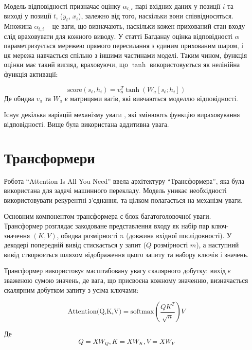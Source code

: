Модель відповідності призначає оцінку $\alpha_{t,i}$
парі вхідних даних у позиції $i$ та виході у позиції $t$, ($y_t$, $x_i$),
залежно від того, наскільки вони співвідносяться. Множина
${α_{t,i}}$ -- це ваги, що визначають, наскільки кожен прихований стан
входу слід враховувати для кожного виводу.
У статті Багданау \cite{nn:attention} оцінка відповідності
$α$ параметризується мережею прямого пересилання
з єдиним прихованим шаром, і ця мережа навчається спільно з
іншими частинами моделі. Таким чином, функція оцінки
має такий вигляд, враховуючи, що $\tanh$ використовується як
нелінійна функція активації:

\begin{equation}
    \text{score}(s_t, h_i) = v^T_a \tanh(W_a [s_t;h_i])
\end{equation}
Де обидва $v_a$ та $W_a$ є матрицями вагів, які вивчаються
моделлю відповідності.

Існує декілька варіацій механізму
уваги \cite{attention:1} \cite{attention:2}, які змінюють
функцію вираховування відповідності. Вище
була використана аддитивна \cite{nn:attention} увага.

\section{Трансформери}
Робота ``Attention Is All You Need'' \cite{attention-all-need}
ввела архітектуру
``Трансформера'', яка була використана для задачі машинного
перекладу. Модель уникає необхідності використовувати
рекурентні з'єднання, та цілком полагається на
механізм уваги.

Основним компонентом трансформера є блок
багатоголовочної уваги. Трансформер розглядає закодоване
представлення входу як набір пар ключ-значення $(K, V)$,
обидва розмірності $n$ (довжина вхідної послідовності).
У декодері попередній вивід стискається у запит 
($Q$ розмірності $m$), а наступний вивід створюється
шляхом відображення цього запиту та набору ключів і значень.

Трансформер використовує масштабовану увагу
скалярного добутку: вихід є зваженою сумою значень,
де вага, що присвоєна кожному значенню, визначається
скалярним добутком запиту з усіма ключами:

\begin{equation}
    \text{Attention(Q,K,V)} = \text{softmax}(\frac{QK^T}{\sqrt{n}})V
\end{equation}

Де
\begin{equation}
    Q=XW_Q, K=XW_K, V=XW_V
\end{equation}

